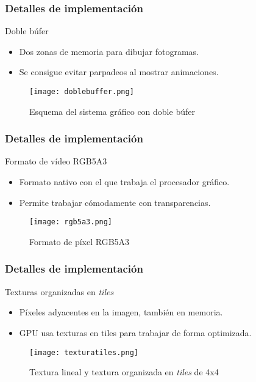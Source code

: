 \begin{frame}
\frametitle{Detalles de implementación}
	\begin{block}{Doble búfer}
		\begin{itemize}
			\item Dos zonas de memoria para dibujar fotogramas.
			\item Se consigue evitar parpadeos al mostrar animaciones.
		\end{itemize}
	\end{block}
	\begin{figure}[H]
		\label{doblebuffer}
		\begin{center}
		\texttt{[image: doblebuffer.png]}
		\end{center}
		\caption{Esquema del sistema gráfico con doble búfer}
	\end{figure}
\end{frame}

\begin{frame}
\frametitle{Detalles de implementación}
	\begin{block}{Formato de vídeo RGB5A3}
		\begin{itemize}
		\item Formato nativo con el que trabaja el procesador gráfico.
		\item Permite trabajar cómodamente con transparencias.
		\end{itemize}
	\end{block}
	\begin{figure}[H]
		\label{rgb5a3}
		\begin{center}
		\texttt{[image: rgb5a3.png]}
		\end{center}
		\caption{Formato de píxel RGB5A3}
	\end{figure}
\end{frame}

\begin{frame}
\frametitle{Detalles de implementación}
	\begin{block}{Texturas organizadas en \textit{tiles}}
		\begin{itemize}
			\item Píxeles adyacentes en la imagen, también en memoria.
			\item GPU usa texturas en tiles para trabajar de forma optimizada.
		\end{itemize}
	\end{block}
	\begin{figure}[H]
		\label{texturatiles}
		\begin{center}
		\texttt{[image: texturatiles.png]}
		\end{center}
		\caption{Textura lineal y textura organizada en \textit{tiles} de 4x4}
	\end{figure}
\end{frame}

